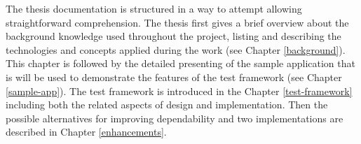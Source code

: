 The thesis documentation is structured in a way to attempt allowing straightforward comprehension. The thesis first gives a brief overview about the background knowledge used throughout the project, listing and describing the technologies and concepts applied during the work (see Chapter \ref{background}). This chapter is followed by the detailed presenting of the sample application that is will be used to demonstrate the features of the test framework (see Chapter \ref{sample-app}). The test framework is introduced in the Chapter \ref{test-framework} including both the related aspects of design and implementation. Then the possible alternatives for improving dependability and two implementations are described in Chapter \ref{enhancements}.


























